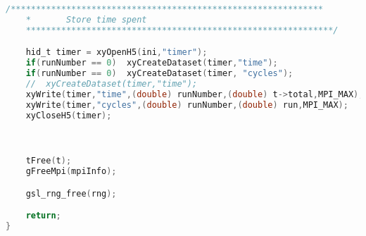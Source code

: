 \begin{lstlisting}[language=c, caption = main routine]
	/**************************************************************
	*		Store time spent
	*************************************************************/

	hid_t timer = xyOpenH5(ini,"timer");
	if(runNumber == 0)	xyCreateDataset(timer,"time");
	if(runNumber == 0)	xyCreateDataset(timer, "cycles");
	//  xyCreateDataset(timer,"time");
	xyWrite(timer,"time",(double) runNumber,(double) t->total,MPI_MAX);
	xyWrite(timer,"cycles",(double) runNumber,(double) run,MPI_MAX);
	xyCloseH5(timer);



	tFree(t);
	gFreeMpi(mpiInfo);

	gsl_rng_free(rng);

	return;
}

\end{lstlisting}
